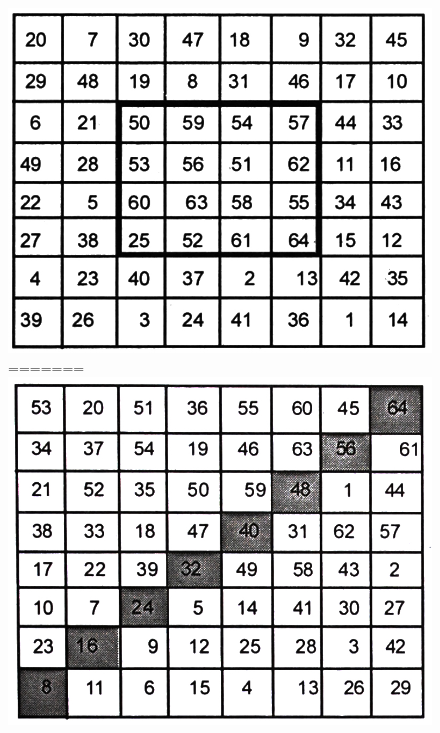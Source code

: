\begin{figure}[H]
\includegraphics{src/figures/chap6/fig6-22.jpg}
=======
\includegraphics[scale=0.9]{src/figures/chap6/fig6.21.jpg}
\end{figure}
